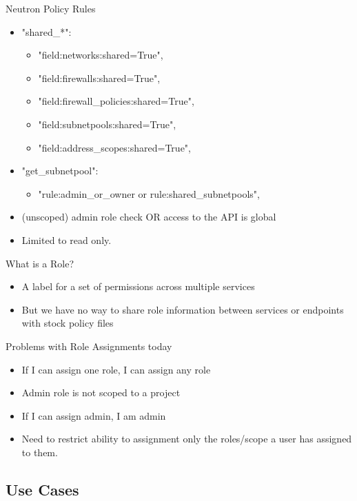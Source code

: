 \documentclass{beamer}
\begin{document}
\begin{frame}Neutron Policy Rules{}
  \begin{itemize}
  \item "shared\_*":
    \begin{itemize}
    \item "field:networks:shared=True",
    \item "field:firewalls:shared=True",
    \item "field:firewall\_policies:shared=True",
    \item "field:subnetpools:shared=True",
    \item "field:address\_scopes:shared=True",
    \end{itemize}
  \item "get\_subnetpool":
    \begin{itemize}
    \item "rule:admin\_or\_owner or rule:shared\_subnetpools",
    \end{itemize}
  \item (unscoped) admin role check OR access to the API is global
  \item Limited to read only.
  \end{itemize}
\end{frame}

\begin{frame}What is a Role?{}
  \begin{itemize}
    \item A label for a set of permissions across multiple services
    \item But we have no way to share role information between services or endpoints with stock policy files
  \end{itemize}
\end{frame}

\begin{frame}{Problems with Role Assignments today}
  \begin{itemize}
  \item If I can assign one role, I can assign any role
  \item Admin role is not scoped to a project
  \item If I can assign admin, I am admin
  \item Need to restrict ability to assignment only the roles/scope a user has assigned to them.
  \end{itemize}
\end{frame}


\subsection {Use Cases}
\end{document}

